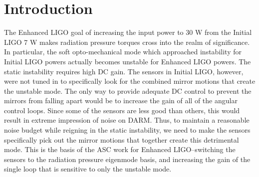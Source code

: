 \section{Introduction}


The Enhanced LIGO goal of increasing the input power to 30 W from the
Initial LIGO 7 W makes radiation pressure torques cross into the realm
of significance. In particular, the soft opto-mechanical mode which
approached instability for Initial LIGO powers actually becomes
unstable for Enhanced LIGO powers. The static instability requires
high DC gain. The sensors in Initial LIGO, however, were not tuned in
to specifically look for the combined mirror motions that create the
unstable mode. The only way to provide adequate DC control to prevent
the mirrors from falling apart would be to increase the gain of all of
the angular control loops. Since some of the sensors are less good
than others, this would result in extreme impression of noise on
DARM. Thus, to maintain a reasonable noise budget while reigning in
the static instability, we need to make the sensors specifically pick
out the mirror motions that together create this detrimental
mode. This is the basis of the ASC work for Enhanced LIGO--switching
the sensors to the radiation pressure eigenmode basis, and increasing
the gain of the single loop that is sensitive to only the unstable mode. 

